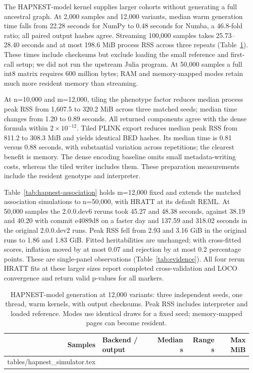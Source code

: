 \documentclass[11pt]{article}
\makeatletter
\newcommand{\tabinput}[1]{\@@input #1 }
\makeatother
\begin{document}
The HAPNEST-model kernel supplies larger cohorts without generating a
full ancestral graph. At 2,000 samples and 12,000 variants, median warm
generation time falls from 22.28 seconds for NumPy to 0.48 seconds for
Numba, a 46.8-fold ratio; all paired output hashes agree. Streaming
100,000 samples takes 25.73--28.40 seconds and at most 198.6 MiB process
RSS across three repeats (Table~\ref{tab:hapnest-simulator}). These times
include checksums but exclude loading the small reference and first-call
setup; we did not run the upstream Julia program. At 50,000
samples a full int8 matrix requires 600 million bytes; RAM and memory-mapped
modes retain much more resident memory than streaming.

At n=10,000 and m=12,000, tiling the phenotype factor reduces median
process peak RSS from 1,607.5 to 320.2 MiB across three matched seeds;
median time changes from 1.20 to 0.89 seconds. All returned components
agree with the dense formula within $2\times10^{-12}$. Tiled PLINK
export reduces median peak RSS from 811.2 to 308.3 MiB and yields identical
BED hashes. Its median time is 0.81 versus 0.88 seconds, with substantial
variation across repetitions; the clearest benefit is memory. The dense
encoding baseline omits small metadata-writing costs, whereas the tiled
writer includes them. These preparation measurements include the resident
genotype and interpreter.

Table~\ref{tab:hapnest-association} holds m=12,000 fixed and extends the
matched association simulations to n=50,000, with HRATT at its default REML.
At 50,000 samples the 2.0.0.dev6 reruns took 45.27 and 48.38 seconds,
against 38.19 and 40.20 with commit e4089d8 on a faster day and 137.59 and
318.02 seconds in the original 2.0.0.dev2 runs. Peak RSS fell from 2.93 and 3.16 GiB in the original
runs to 1.86 and 1.83 GiB. Fitted heritabilities are unchanged; with
cross-fitted scores, inflation moved by at most 0.07 and rejection by at
most 0.2 percentage points. These are single-panel observations
(Table~\ref{tab:evidence}). All four rerun HRATT fits at these larger sizes report completed
cross-validation and LOCO convergence and return valid p-values for all
markers.

\begin{table}[htbp]
 \centering\small
 \caption{HAPNEST-model generation at 12,000 variants: three independent
 seeds, one thread, warm kernels, with output checksums. Peak RSS includes
 interpreter and loaded reference. Modes use identical draws for a fixed
 seed; memory-mapped pages can become resident.}
 \label{tab:hapnest-simulator}
 \begin{tabular}{@{}rlrrr@{}}
 \toprule
 Samples & Backend / output & Median s & Range s & Max MiB \\
 \midrule
 \tabinput{tables/hapnest_simulator.tex}
 \bottomrule
 \end{tabular}
\end{table}
\end{document}

